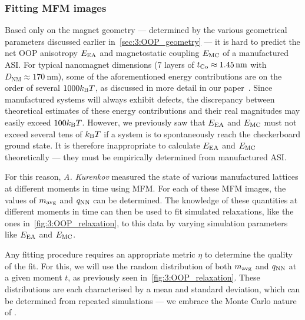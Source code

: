 \subsubsection{Fitting MFM images}\label{sec:3:OOP:MFM}
Based only on the magnet geometry --- determined by the various geometrical parameters discussed earlier in~\cref{sec:3:OOP_geometry} --- it is hard to predict the net OOP anisotropy $E_\mathrm{EA}$ and magnetostatic coupling $E_\mathrm{MC}$ of a manufactured ASI.
For typical nanomagnet dimensions (7 layers of $t_{\ce{Co}} \approx \SI{1.45}{\nano\metre}$ with $D_\mathrm{NM} \approx \SI{170}{\nano\metre}$), some of the aforementioned energy contributions are on the order of several $1000 \kBT$, as discussed in more detail in our paper~\cite{KUR-24}. %
Since manufactured systems will always exhibit defects, the discrepancy between theoretical estimates of these energy contributions and their real magnitudes may easily exceed $100 \kBT$. %
However, we previously saw that $E_\mathrm{EA}$ and $E_\mathrm{MC}$ must not exceed several tens of $\kBT$ if a system is to spontaneously reach the checkerboard ground state.
It is therefore inappropriate to calculate $E_\mathrm{EA}$ and $E_\mathrm{MC}$ theoretically --- they must be empirically determined from manufactured ASI. \par
For this reason, \textit{A. Kurenkov} measured the state of various manufactured lattices at different moments in time using MFM.
For each of these MFM images, the values of $m_\mathrm{avg}$ and $q_\mathrm{NN}$ can be determined.
The knowledge of these quantities at different moments in time can then be used to fit simulated relaxations, like the ones in~\cref{fig:3:OOP_relaxation}, to this data by varying simulation parameters like $E_\mathrm{EA}$ and $E_\mathrm{MC}$. \par
Any fitting procedure requires an appropriate metric $\eta$ to determine the quality of the fit.
For this, we will use the random distribution of both $m_\mathrm{avg}$ and $q_\mathrm{NN}$ at a given moment $t$, as previously seen in~\cref{fig:3:OOP_relaxation}.
These distributions are each characterised by a mean and standard deviation, which can be determined from repeated simulations --- we embrace the Monte Carlo nature of \hotspice.

